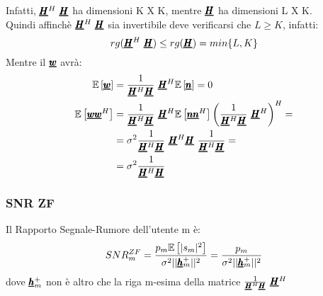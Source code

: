Infatti, $\pmb{\underline{H}}^H \ \pmb{\underline{H}}$ ha dimensioni K X K, mentre $\pmb{\underline{H}}$ ha dimensioni L X K.\\
Quindi affinchè $\pmb{\underline{H}}^H \ \pmb{\underline{H}}$ sia invertibile deve verificarsi che $L \geq K$, infatti:
\begin{equation*}
    rg(\pmb{\underline{H}}^H \ \pmb{\underline{H}}) \leq rg(\pmb{\underline{H}}) = min\{L,K\}
\end{equation*}
Mentre il $\pmb{\underline{w}}$ avrà:
\begin{equation*}
    \begin{aligned}
    \av{\vc{w}} &= \frac{1}{\vc{H}^H \vc{H}} \ \vc{H}^H  \av{\vc{n}} = 0 \\
    \av{\vc{w}\vc{w}^H} &= \frac{1}{\vc{H}^H \vc{H}} \ \vc{H}^H \av{\vc{n}\vc{n}^H} \left(\frac{1}{\vc{H}^H \vc{H}} \ \vc{H}^H\right)^H = \\
    &= \sigma^2 \frac{1}{\vc{H}^H \vc{H}} \ \vc{H}^H \vc{H} \ \frac{1}{\vc{H}^H \vc{H}} = \\
    &= \sigma^2 \frac{1}{\vc{H}^H \vc{H}}
    \end{aligned}
\end{equation*}

\subsubsection{SNR ZF}
Il Rapporto Segnale-Rumore dell'utente m è:
\begin{equation*}
    SNR_m^{ZF} = \frac{p_m \mathbb{E}\left[|s_m|^2\right]}{\sigma^2 ||\pmb{\underline{h}}_m^+||^2} = \frac{p_m}{\sigma^2 ||\pmb{\underline{h}}_m^+||^2}
\end{equation*}
dove $\pmb{\underline{h}}_m^+$ non è altro che la riga m-esima della matrice $\frac{1}{\pmb{\underline{H}}^H \pmb{\underline{H}}} \ \pmb{\underline{H}}^H$



